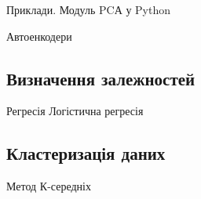Приклади. Модуль PCА у Python

Автоенкодери

\subsection{Визначення залежностей}

Регресія
Логістична регресія

\subsection{Кластеризація даних}

Метод К-середніх

